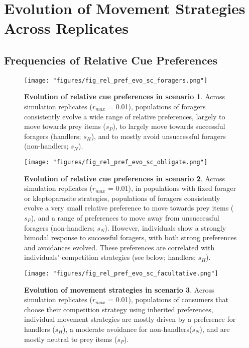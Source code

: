 \documentclass[]{article}
\begin{document}
\newpage

\hypertarget{evolution-of-movement-strategies-across-replicates}{%
\section{Evolution of Movement Strategies Across Replicates}\label{evolution-of-movement-strategies-across-replicates}}

\hypertarget{frequencies-of-relative-cue-preferences}{%
\subsection{Frequencies of Relative Cue Preferences}\label{frequencies-of-relative-cue-preferences}}

\begin{figure}
\centering
\texttt{[image: "figures/fig\_rel\_pref\_evo\_sc\_foragers.png"]}
\caption{\textbf{Evolution of relative cue preferences in scenario 1}. Across simulation replicates (\(r_{max}\) = 0.01), populations of foragers consistently evolve a wide range of relative preferences, largely to move towards prey items (\(s_P\)), to largely move towards successful foragers (handlers; \(s_H\)), and to mostly avoid unsuccessful foragers (non-handlers; \(s_N\)).}
\end{figure}

\begin{figure}
\centering
\texttt{[image: "figures/fig\_rel\_pref\_evo\_sc\_obligate.png"]}
\caption{\textbf{Evolution of relative cue preferences in scenario 2}. Across simulation replicates (\(r_{max}\) = 0.01), in populations with fixed forager or kleptoparasite strategies, populations of foragers consistently evolve a very small relative preference to move towards prey items (\(s_P\)), and a range of preferences to move away from unsuccessful foragers (non-handlers; \(s_N\)). However, individuals show a strongly bimodal response to successful foragers, with both strong preferences and avoidances evolved. These preferences are correlated with individuals' competition strategies (see below; handlers; \(s_H\)).}
\end{figure}

\begin{figure}
\centering
\texttt{[image: "figures/fig\_rel\_pref\_evo\_sc\_facultative.png"]}
\caption{\textbf{Evolution of movement strategies in scenario 3}. Across simulation replicates (\(r_{max}\) = 0.01), populations of consumers that choose their competition strategy using inherited preferences, individual movement strategies are mostly driven by a preference for handlers (\(s_H\)), a moderate avoidance for non-handlers(\(s_N\)), and are mostly neutral to prey items (\(s_P\)).}
\end{figure}
\end{document}
